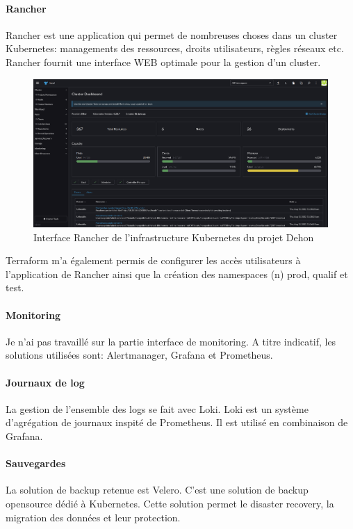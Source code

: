 \documentclass[12pt]{article}
\begin{document}
\paragraph{Rancher}
Rancher est une application qui permet de nombreuses choses dans un cluster Kubernetes: managements des ressources, droits utilisateurs, règles réseaux etc. 
Rancher fournit une interface WEB optimale pour la gestion d'un cluster.

\begin{figure}[!ht]
    \centering
        \includegraphics[width=\textwidth]{src/rancher_interface.png}
    \caption{Interface Rancher de l'infrastructure Kubernetes du projet Dehon}
    \label{fig:rancher_interface}
\end{figure}

Terraform m'a également permis de configurer les accès utilisateurs à l'application de Rancher ainsi que la création des namespaces (n) prod, qualif et test.

\paragraph{Monitoring}
Je n'ai pas travaillé sur la partie interface de monitoring.
A titre indicatif, les solutions utilisées sont: Alertmanager, Grafana et Prometheus.

\paragraph{Journaux de log}
La gestion de l'ensemble des logs se fait avec Loki.
Loki est un système d'agrégation de journaux inspité de Prometheus.
Il est utilisé en combinaison de Grafana.

\paragraph{Sauvegardes}
La solution de backup retenue est Velero.
C'est une solution de backup opensource dédié à Kubernetes.
Cette solution permet le disaster recovery, la migration des données et leur protection.
\end{document}
